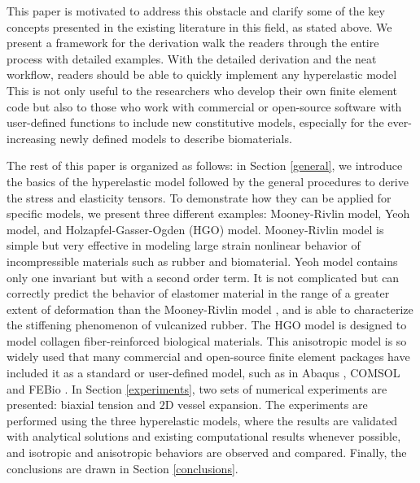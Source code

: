 This paper is motivated to address this obstacle and clarify some of the key concepts presented in the existing literature in this field, as stated above. We present a framework for the derivation walk the readers through the entire process with detailed examples. With the detailed derivation and the neat workflow, readers should be able to quickly implement any hyperelastic model This is not only useful to the researchers who develop their own finite element code but also to those who work with commercial or open-source software with user-defined functions to include new constitutive models, especially for the ever-increasing newly defined models to describe biomaterials.

The rest of this paper is organized as follows: in Section \ref{general}, we introduce the basics of the hyperelastic model followed by the general procedures to derive the stress and elasticity tensors. To demonstrate how they can be applied for specific models, we present three different examples: Mooney-Rivlin model, Yeoh model, and Holzapfel-Gasser-Ogden (HGO) model. Mooney-Rivlin model is simple but very effective in modeling large strain nonlinear behavior of incompressible materials such as rubber and biomaterial. Yeoh model contains only one invariant but with a second order term. It is not complicated but can correctly predict the behavior of elastomer material in the range of a greater extent of deformation than the Mooney-Rivlin model \cite{Gajewski}, and is able to characterize the stiffening phenomenon of vulcanized rubber. The HGO model is designed to model collagen fiber-reinforced biological materials. This anisotropic model is so widely used that many commercial and open-source finite element packages have included it as a standard or user-defined model,  such as in Abaqus \cite{Abaqus}, COMSOL \cite{COMSOL} and FEBio \cite{FEBio}. In Section \ref{experiments}, two sets of numerical experiments are presented: biaxial tension and $2$D vessel expansion. The experiments are performed using the three hyperelastic models, where the results are validated with analytical solutions and existing computational results whenever possible, and isotropic and anisotropic behaviors are observed and compared. Finally, the conclusions are drawn in Section \ref{conclusions}.




 



